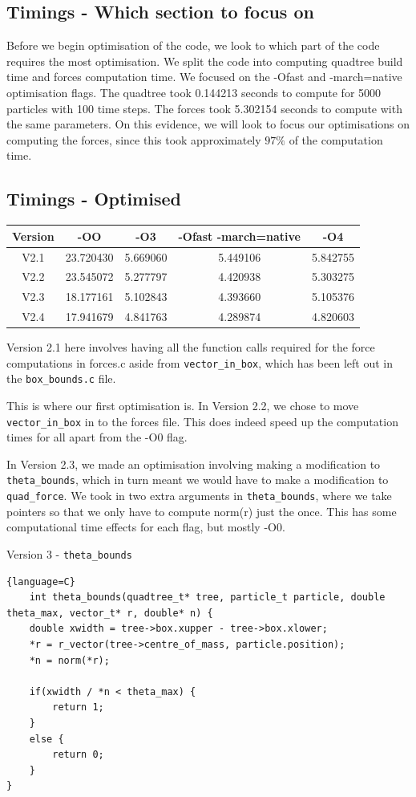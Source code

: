 \subsection{Timings - Which section to focus on}
Before we begin optimisation of the code, we look to which part of the code requires the most optimisation. We split the code into computing quadtree build time and forces computation time. We focused on the -Ofast and -march=native optimisation flags. The quadtree took 0.144213 seconds to compute for 5000 particles with 100 time steps. The forces took 5.302154 seconds to compute with the same parameters. On this evidence, we will look to focus our optimisations on computing the forces, since this took approximately $97\%$ of the computation time.
\subsection{Timings - Optimised}
\begin{center}
  \begin{tabular}{|c|c|c|c|c|}
    \hline
    Version & -OO & -O3 & -Ofast -march=native & -O4\\
    \hline
    V2.1 & 23.720430 & 5.669060 & 5.449106 & 5.842755\\
    \hline
    V2.2 & 23.545072 & 5.277797 & 4.420938 & 5.303275\\
    \hline
    V2.3 & 18.177161 & 5.102843 & 4.393660 & 5.105376\\
    \hline
    V2.4 & 17.941679 & 4.841763 & 4.289874 & 4.820603\\
    \hline
  \end{tabular}
\end{center}
Version 2.1 here involves having all the function calls required for the force computations in forces.c aside from \verb|vector_in_box|, which has been left out in the \verb|box_bounds.c| file.

This is where our first optimisation is. In Version 2.2, we chose to move \verb|vector_in_box| in to the forces file. This does indeed speed up the computation times for all apart from the -O0 flag.

In Version 2.3, we made an optimisation involving making a modification to \verb|theta_bounds|, which in turn meant we would have to make a modification to \verb|quad_force|. We took in two extra arguments in \verb|theta_bounds|, where we take pointers so that we only have to compute norm(r) just the once. This has some computational time effects for each flag, but mostly -O0.
\begin{center}
    Version 3 - \verb|theta_bounds|
\end{center}
\begin{lstlisting}{language=C}
    int theta_bounds(quadtree_t* tree, particle_t particle, double theta_max, vector_t* r, double* n) {
    double xwidth = tree->box.xupper - tree->box.xlower;
    *r = r_vector(tree->centre_of_mass, particle.position);
    *n = norm(*r);

    if(xwidth / *n < theta_max) {
        return 1;
    }
    else {
        return 0;
    }
}
\end{lstlisting}

